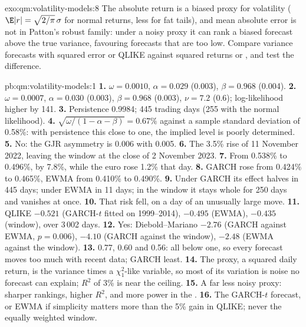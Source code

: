 \begin{solution}{exo:qm:volatility-models:8}
The absolute return is a biased proxy for volatility ($\E|r| = \sqrt{2/\pi}\,\sigma$ for normal returns, less for fat tails), and mean absolute error is not in Patton's
robust family: under a noisy proxy it can rank a biased forecast above the true variance, favouring forecasts that are too low. Compare variance forecasts
with squared error or QLIKE against squared returns or , and test the difference.
\end{solution}

\begin{solution}{pb:qm:volatility-models:1}
\textbf{1.} $\omega = 0.0010$, $\alpha = 0.029$ (0.003), $\beta = 0.968$ (0.004).
\textbf{2.} $\omega = 0.0007$, $\alpha = 0.030$ (0.003), $\beta = 0.968$ (0.003), $\nu = 7.2$ (0.6); log-likelihood higher by 141.
\textbf{3.} Persistence 0.9984;  445 trading days (255 with the normal likelihood).
\textbf{4.} $\sqrt{\omega/(1 - \alpha - \beta)} = 0.67\%$ against a sample standard deviation of 0.58\%: with persistence this close to one, the implied level is poorly
determined.
\textbf{5.} No: the GJR asymmetry is 0.006 with  0.005.
\textbf{6.} The 3.5\% rise of 11 November 2022, leaving the window at the close of 2 November 2023.
\textbf{7.} From 0.538\% to 0.496\%, by 7.8\%, while the euro rose 1.2\% that day.
\textbf{8.} GARCH rose from 0.424\% to 0.465\%, EWMA from 0.410\% to 0.490\%.
\textbf{9.} Under GARCH its effect halves in 445 days; under EWMA in 11 days; in the window it stays whole for 250 days and vanishes at once.
\textbf{10.} That risk fell, on a day of an unusually large move.
\textbf{11.} QLIKE $-0.521$ (GARCH-$t$ fitted on 1999--2014), $-0.495$ (EWMA), $-0.435$ (window), over 3\,002 days.
\textbf{12.} Yes: Diebold--Mariano $-2.76$ (GARCH against EWMA, $p = 0.006$), $-4.10$ (GARCH against the window), $-2.48$ (EWMA against the window).
\textbf{13.} 0.77, 0.60 and 0.56: all below one, so every forecast moves too much with recent data; GARCH least.
\textbf{14.} The proxy, a squared daily return, is the variance times a $\chi^2_1$-like variable, so most of its variation is noise no forecast can explain; $R^2$ of 3\% is
near the ceiling.
\textbf{15.} A far less noisy proxy: sharper rankings, higher $R^2$, and more power in the .
\textbf{16.} The GARCH-$t$ forecast, or EWMA if simplicity matters more than the 5\% gain in QLIKE; never the equally weighted window.

\end{solution}
